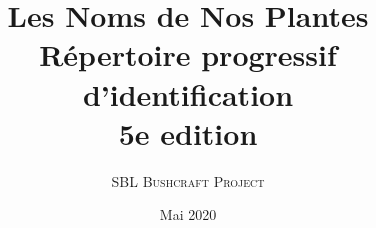 \pretitle{{\vskip 2cm} \centering\huge}
\posttitle{\par\vskip 1.25cm}
\preauthor{\centering\large}
\postauthor{\par}
\predate{\par\centering\vskip 0.5cm}
\postdate{\par\vskip 1cm\vfill}

\title{%
  {\bfseries Les Noms de Nos Plantes}\\[.25em]
  {\large Répertoire progressif d'identification}\\[.25em]
  {\Large 5e edition}}
\author{{\Large\scshape SBL Bushcraft Project}}
\date{Mai 2020}

\newcommand{\mytitlepage}{%
  \pagenumbering{gobble}
   \begin{titlingpage}
     \maketitle
    \thispagestyle{plain}
     \clearpage 
         {\centering
           {\par\noindent\large\itshape
             Nomina si nescis, perit et cognitio rerum.}
           \medskip
               {\par\hfill ---Linné 1775}}
         \vfill
             {\par\noindent\large © SBL Bushcraft Project 2020}
   \end{titlingpage}
   \pagenumbering{arabic}
}
